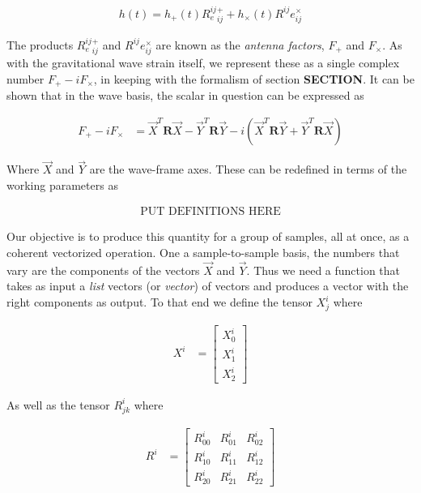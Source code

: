\begin{align}
h(t) = h_{+}(t)R^{ij}_e^+_{ij} + h_{\times}(t)R^{ij}e^{\times}_{ij}
\end{align}

The products $R^{ij}_e^+_{ij}$ and $R^{ij}e^{\times}_{ij}$ are known as the \textit{antenna factors}, $F_{+}$ and $F_{\times}$. As with the gravitational wave strain itself, we represent these as a single complex number $F_{+} - i F_{\times}$, in keeping with the formalism of section \textbf{SECTION}. It can be shown that in the wave basis, the scalar in question can be expressed as  

\begin{align}
F_+ - i F_{\times} &= \vec{X}^T\mathbf{R}\vec{X} - \vec{Y}^T\mathbf{R}\vec{Y} - i(\vec{X}^T\mathbf{R}\vec{Y} + \vec{Y}^T\mathbf{R}\vec{X})
\end{align} 

Where $\vec{X}$ and $\vec{Y}$ are the wave-frame axes. These can be redefined in terms of the working parameters as 

\begin{align}
\text{PUT DEFINITIONS HERE}
\end{align}
 
Our objective is to produce this quantity for a group of samples, all at once, as a coherent vectorized operation. One a sample-to-sample basis, the numbers that vary are the components of the vectors $\vec{X}$ and $\vec{Y}$. Thus we need a function that takes as input a \textit{list} vectors (or \textit{vector}) of vectors and produces a vector with the right components as output. To that end we define the tensor $X^{i}_{j}$ where

\begin{align}
X^i &= 
\begin{bmatrix}
X^{i}_0 \\
X^{i}_1 \\
X^{i}_2
\end{bmatrix}
\end{align}

As well as the tensor $R^{i}_{jk}$ where

\begin{align}
R^{i} &= 
\begin{bmatrix}
R^{i}_{00} & R^{i}_{01} & R^{i}_{02} \\ 
R^{i}_{10} & R^{i}_{11} & R^{i}_{12} \\ 
R^{i}_{20} & R^{i}_{21} & R^{i}_{22}  
\end{bmatrix}
\end{align}

